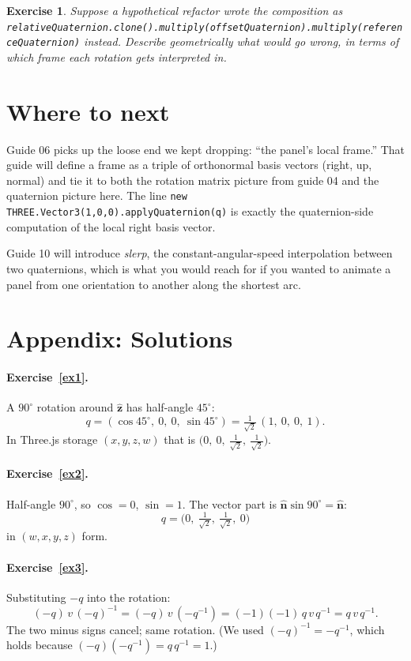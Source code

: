 \documentclass{article}
\newtheorem{exercise}{Exercise}
\begin{document}
\begin{exercise}\label{exB}
Suppose a hypothetical refactor wrote the composition as
\texttt{relativeQuaternion.clone().multiply(offsetQuaternion).multiply(referenceQuaternion)}
instead. Describe geometrically what would go wrong, in terms of which
frame each rotation gets interpreted in.
\end{exercise}

\section{Where to next}

Guide 06 picks up the loose end we kept dropping: ``the panel's local
frame.'' That guide will define a frame as a triple of orthonormal basis
vectors (right, up, normal) and tie it to both the rotation matrix
picture from guide 04 and the quaternion picture here. The line
\texttt{new THREE.Vector3(1,0,0).applyQuaternion(q)} is exactly the
quaternion-side computation of the local right basis vector.

Guide 10 will introduce \emph{slerp}, the constant-angular-speed
interpolation between two quaternions, which is what you would reach for
if you wanted to animate a panel from one orientation to another along
the shortest arc.

\section*{Appendix: Solutions}

\paragraph{Exercise~\ref{ex1}.} A $90^\circ$ rotation around
$\hat{\mathbf{z}}$ has half-angle $45^\circ$:
\[
  q = (\cos 45^\circ,\ 0,\ 0,\ \sin 45^\circ)
    = \tfrac{1}{\sqrt{2}}\,(1,\ 0,\ 0,\ 1).
\]
In Three.js storage $(x, y, z, w)$ that is
$\bigl(0,\ 0,\ \tfrac{1}{\sqrt{2}},\ \tfrac{1}{\sqrt{2}}\bigr)$.

\paragraph{Exercise~\ref{ex2}.} Half-angle $90^\circ$, so $\cos = 0$,
$\sin = 1$. The vector part is $\hat{\mathbf{n}}\sin 90^\circ = \hat{\mathbf{n}}$:
\[
  q = \bigl(0,\ \tfrac{1}{\sqrt{2}},\ \tfrac{1}{\sqrt{2}},\ 0\bigr)
\]
in $(w, x, y, z)$ form.

\paragraph{Exercise~\ref{ex3}.} Substituting $-q$ into the rotation:
\[
  (-q)\, v\, (-q)^{-1} = (-q)\, v\, (-q^{-1}) = (-1)(-1)\, q\, v\, q^{-1} = q\, v\, q^{-1}.
\]
The two minus signs cancel; same rotation. (We used
$(-q)^{-1} = -q^{-1}$, which holds because
$(-q)(-q^{-1}) = q\,q^{-1} = 1$.)
\end{document}
